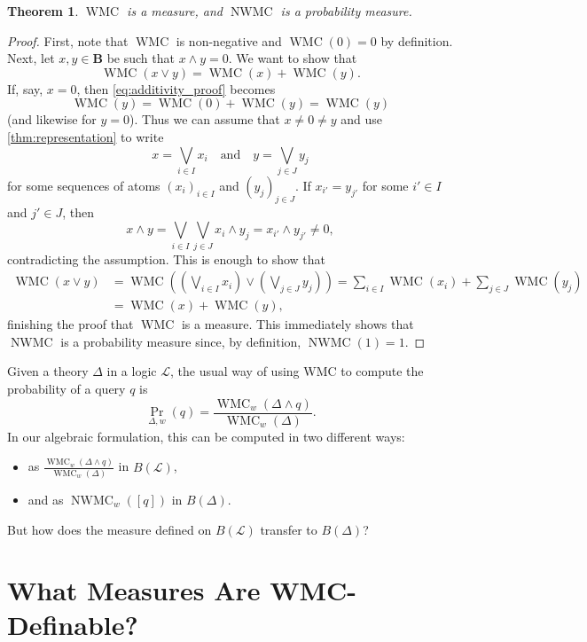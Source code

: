 \documentclass{article}
\newtheorem{theorem}{Theorem}
\theoremstyle{definition}
\theoremstyle{remark}
\DeclareMathOperator{\WMC}{WMC}
\DeclareMathOperator{\nWMC}{NWMC}
\begin{document}
\begin{theorem}
  $\WMC$ is a measure, and $\nWMC$ is a probability measure.
\end{theorem}
\begin{proof}
  First, note that $\WMC$ is non-negative and $\WMC(0) = 0$ by definition. Next,
  let $x, y \in \mathbf{B}$ be such that $x \land y = 0$. We want to show that
  \begin{equation} \label{eq:additivity_proof}
    \WMC(x \lor y) = \WMC(x) + \WMC(y).
  \end{equation}
  If, say, $x = 0$, then \cref{eq:additivity_proof} becomes
  \[
    \WMC(y) = \WMC(0) + \WMC(y) = \WMC(y)
  \]
  (and likewise for $y = 0$). Thus we can assume that $x \ne 0 \ne y$ and use
  \cref{thm:representation} to write
  \[
    x = \bigvee_{i \in I} x_i \quad \text{and} \quad y = \bigvee_{j \in J} y_j
  \]
  for some sequences of atoms $(x_i)_{i \in I}$ and $(y_j)_{j \in J}$. If
  $x_{i'} = y_{j'}$ for some $i' \in I$ and $j' \in J$, then
  \[
    x \land y = \bigvee_{i \in I} \bigvee_{j \in J} x_i \land y_j = x_{i'} \land
    y_{j'} \ne 0,
  \]
  contradicting the assumption. This is enough to show that
  \begin{align*}
    \WMC(x \lor y) &= \WMC\left( \left( \bigvee_{i \in I} x_i \right) \lor \left(\bigvee_{j \in J} y_j \right) \right) = \sum_{i \in I} \WMC(x_i) + \sum_{j \in J} \WMC(y_j) \\
                   &= \WMC(x) + \WMC(y),
  \end{align*}
  finishing the proof that $\WMC$ is a measure. This immediately shows that
  $\nWMC$ is a probability measure since, by definition, $\nWMC(1) = 1$.
\end{proof}

Given a theory $\Delta$ in a logic $\mathcal{L}$, the usual way of using WMC to
compute the probability of a query $q$ is
\cite{DBLP:conf/uai/Belle17,DBLP:conf/aaai/SangBK05}
\[
  \Pr_{\Delta, w}(q) = \frac{\WMC_w(\Delta \land q)}{\WMC_w(\Delta)}.
\]
In our algebraic formulation, this can be computed in two different ways:
\begin{itemize}
\item as $\frac{\WMC_w(\Delta \land q)}{\WMC_w(\Delta)}$ in $B(\mathcal{L})$,
\item and as $\nWMC_w([q])$ in $B(\Delta)$.
\end{itemize}
But how does the measure defined on $B(\mathcal{L})$ transfer to $B(\Delta)$?

\section{What Measures Are WMC-Definable?}
\end{document}
